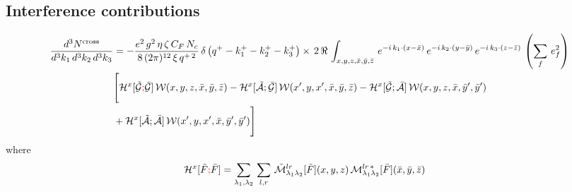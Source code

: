 \documentclass[9pt]{article}
\newif\ifmarked \markedtrue
\newcommand{\chg}[1]{\ifmarked{\color{red}#1}\else{#1}\fi}
\numberwithin{equation}{section}
\begin{document}
\subsection{Interference contributions} 
\begin{align}
     \frac{d^{3}N^{\text{cross}}}{d^{3}k_{1}\,d^{3}k_{2}\, d^{3}k_{3}} & = -\frac{e^{2}\,g^{2}\,\eta\,\zeta\,C_{F}\,N_{c}}{8\, (2\pi)^{12}\,\xi\,q^{+\,2}}\, \delta\left(q^{+}-k^{+}_{1}-k^{+}_{2}-k^{+}_{3}\right)\times\, 2\,\mathcal{\Re}\,\int_{x,y,z,\Bar{x},\Bar{y},\Bar{z}}\, e^{-i\,k_{1}\cdot (x-\Bar{x})}\, e^{-i\,k_{2}\cdot (y-\Bar{y})}\, e^{-i\,k_{3}\cdot (z-\Bar{z})}\,\left(\sum_{f}\, e^{2}_{f}\right)\notag \\ &  \Bigg[\mathcal{H}^{x}[\mathcal{\Tilde{G}}\chg{;}\Bar{\mathcal{G}}]\,\mathcal{W}(x,y,z,\Bar{x},\Bar{y},\Bar{z})-\mathcal{H}^{x}[\Tilde{\mathcal{A}};\Bar{\mathcal{G}}]\,\mathcal{W}(x',y,x',\Bar{x},\Bar{y},\Bar{z})-\mathcal{H}^{x}[\Tilde{\mathcal{G}};\Bar{\mathcal{A}}]\,\mathcal{W}(x,y,z,\Bar{x},\Bar{y}',\Bar{y}')\notag \\ & +\mathcal{H}^{x}[\Tilde{\mathcal{A}};\Bar{\mathcal{A}}]\,\mathcal{W}(x',y,x',\Bar{x},\Bar{y}',\Bar{y}')\Bigg]
\label{chg:ty2}\end{align}  
where
\begin{align}
    \mathcal{H}^{x} [\Tilde{F}\chg{;}\Bar{F}] & = \sum_{\lambda_{1},\lambda_{2}}\, \sum_{l,r}\, \Tilde{\mathcal{M}}^{lr}_{\lambda_{1}\lambda_{2}}[\Tilde{F}](x,y,z)\,\mathcal{M}^{lr\,*}_{\lambda_{1}\lambda_{2}}[\Bar{F}] (\Bar{x},\Bar{y},\Bar{z})
\label{chg:ty3}\end{align}
\end{document}
